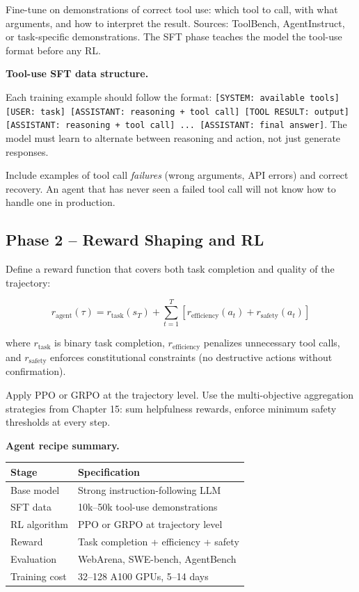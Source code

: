 \begin{chapterenv}
Fine-tune on demonstrations of correct tool use: which tool to call, with what arguments, and how to interpret the result. Sources: ToolBench, AgentInstruct, or task-specific demonstrations. The SFT phase teaches the model the tool-use format before any RL.

\begin{tipbox}
\textbf{Tool-use SFT data structure.}

Each training example should follow the format: \texttt{[SYSTEM: available tools] [USER: task] [ASSISTANT: reasoning + tool call] [TOOL RESULT: output] [ASSISTANT: reasoning + tool call] ... [ASSISTANT: final answer]}. The model must learn to alternate between reasoning and action, not just generate responses.

Include examples of tool call \textit{failures} (wrong arguments, API errors) and correct recovery. An agent that has never seen a failed tool call will not know how to handle one in production.
\end{tipbox}

\subsection{Phase 2 -- Reward Shaping and RL}

Define a reward function that covers both task completion and quality of the trajectory:

$$r_{\text{agent}}(\tau) = r_{\text{task}}(s_T) + \sum_{t=1}^{T} [r_{\text{efficiency}}(a_t) + r_{\text{safety}}(a_t)]$$

where $r_{\text{task}}$ is binary task completion, $r_{\text{efficiency}}$ penalizes unnecessary tool calls, and $r_{\text{safety}}$ enforces constitutional constraints (no destructive actions without confirmation).

Apply PPO or GRPO at the trajectory level. Use the multi-objective aggregation strategies from Chapter 15: sum helpfulness rewards, enforce minimum safety thresholds at every step.

\begin{infobox}
\textbf{Agent recipe summary.}

\begin{tabular}{ll}
\toprule
Stage & Specification \\
\midrule
Base model & Strong instruction-following LLM \\
SFT data & 10k--50k tool-use demonstrations \\
RL algorithm & PPO or GRPO at trajectory level \\
Reward & Task completion + efficiency + safety \\
Evaluation & WebArena, SWE-bench, AgentBench \\
Training cost & 32--128 A100 GPUs, 5--14 days \\
\bottomrule
\end{tabular}
\end{infobox}


\end{chapterenv}
